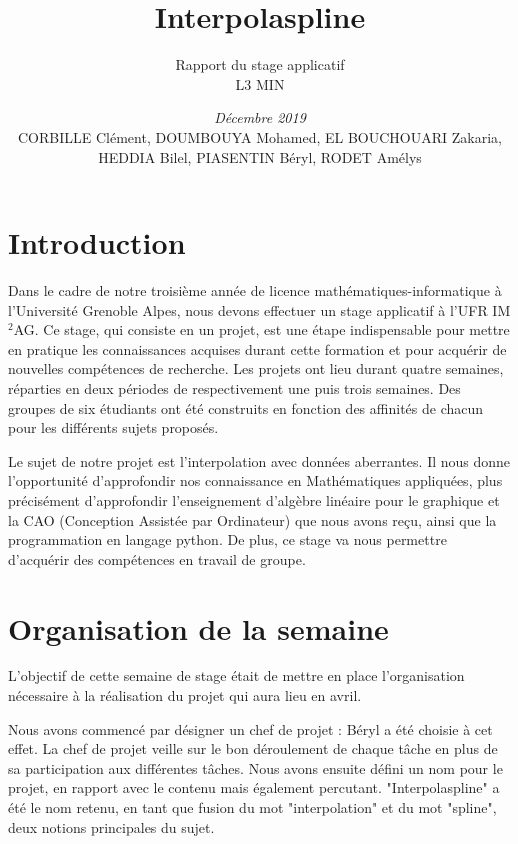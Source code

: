 \documentclass[a4paper,12pt]{article} %
\title{\textbf{Interpolaspline}}
\author{Rapport du stage applicatif\\ L3 MIN}
\date{\emph{Décembre 2019}\\CORBILLE Clément, DOUMBOUYA Mohamed, EL BOUCHOUARI Zakaria, HEDDIA Bilel, PIASENTIN Béryl, RODET Amélys}
\begin{document}

\maketitle %
\tableofcontents %

\newpage

\section*{Introduction}
Dans le cadre de notre troisième année de licence mathématiques-informatique à l’Université Grenoble Alpes, nous devons effectuer un stage applicatif à l’UFR IM$^2$AG. Ce stage, qui consiste en un projet, est une étape indispensable pour mettre en pratique les connaissances acquises durant cette formation et pour acquérir de nouvelles compétences de recherche. Les projets ont lieu durant quatre semaines, réparties en deux périodes de respectivement une puis trois semaines. Des groupes de six étudiants ont été construits en fonction des affinités de chacun pour les différents sujets proposés.

Le sujet de notre projet est l'interpolation avec données aberrantes. Il nous donne l’opportunité d’approfondir nos connaissance en Mathématiques appliquées, plus précisément d'approfondir l'enseignement d'algèbre linéaire pour le graphique et la CAO (Conception Assistée par Ordinateur) que nous avons reçu, ainsi que la programmation en langage  python. De plus, ce stage va nous permettre d'acquérir des compétences en travail de groupe.

\section{Organisation de la semaine}

L'objectif de cette semaine de stage était de mettre en place l'organisation nécessaire à la réalisation du projet qui aura lieu en avril.

Nous avons commencé par désigner un chef de projet : Béryl a été choisie à cet effet. La chef de projet veille sur le bon déroulement de chaque tâche en plus de sa participation aux différentes tâches. Nous avons ensuite défini un nom pour le projet, en rapport avec le contenu mais également percutant. "Interpolaspline" a été le nom retenu, en tant que fusion du mot "interpolation" et du mot "spline", deux notions principales du sujet.
\end{document}
